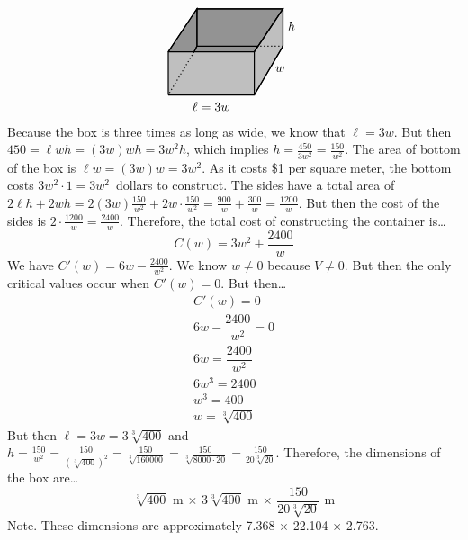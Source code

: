 \documentclass[12pt,letterpaper]{exam}
\begin{document}
\begin{questions}
{	\[
	\begin{tikzpicture}[scale=0.8]
	\draw[line width=0.03cm,fill=gray!85] (0.9,1.5) -- (3,1.5) -- (4,3) -- (1,3) -- (0.9,1.5);
	\draw[line width=0.03cm,fill=gray!85] (0,1.5) -- (0.9,1.50) -- (1,1.7) -- (1,3) -- (0,1.5);
	\draw[line width=0.03cm,fill=gray!50] (0,0) -- (3,0) -- (3,1.5) -- (0,1.5) -- (0,0);
	\draw[line width=0.03cm,fill=gray!50] (3,0) -- (4,1.7) -- (4,3) -- (3,1.5) -- (3,0);
	\draw[line width=0.03cm] (0,1.5) -- (1,3) -- (4,3) -- (3,1.5);
	\draw[line width=0.03cm] (4,3) -- (4,1.7) -- (3,0);
	\draw[line width=0.03cm,dotted] (4,1.7) -- (3.12,1.7);
	\draw[line width=0.03cm] (3.12,1.7) -- (1,1.7) -- (1,3);
	\draw[line width=0.03cm] (1,1.7) -- (0.9,1.5);
	\draw[line width=0.03cm,dotted] (0.9,1.5) -- (0,0);
	\node at (1.5,-0.4) {$\ell= 3w$};
	\node at (3.9,0.9) {$w$};
	\node at (4.3,2.4) {$h$};
	\end{tikzpicture}
	\]
Because the box is three times as long as wide, we know that $\ell= 3w$. But then $450= \ell wh= (3w)wh= 3w^2h$, which implies $h= \frac{450}{3w^2}= \frac{150}{w^2}$. The area of bottom of the box is $\ell w= (3w)w= 3w^2$. As it costs \$1 per square meter, the bottom costs $3w^2 \cdot 1= 3w^2$~dollars to construct. The sides have a total area of $2 \ell h + 2wh= 2(3w) \frac{150}{w^2} + 2w \cdot \frac{150}{w^2}= \frac{900}{w} + \frac{300}{w}= \frac{1200}{w}$. But then the cost of the sides is $2 \cdot \frac{1200}{w}= \frac{2400}{w}$. Therefore, the total cost of constructing the container is\dots
	\[
	C(w)= 3w^2 + \frac{2400}{w}
	\]
We have $C'(w)= 6w - \frac{2400}{w^2}$. We know $w \neq 0$ because $V \neq 0$. But then the only critical values occur when $C'(w)= 0$. But then\dots
	\[
	\begin{gathered}
	C'(w)= 0 \\
	6w - \dfrac{2400}{w^2}= 0 \\
	6w= \dfrac{2400}{w^2} \\
	6w^3= 2400 \\
	w^3= 400 \\
	w= \sqrt[3]{400}
	\end{gathered}
	\]
But then $\ell= 3w= 3\sqrt[3]{400}$ and $h= \frac{150}{w^2}= \frac{150}{(\sqrt[3]{400})^2}= \frac{150}{\sqrt[3]{160000}}= \frac{150}{\sqrt[3]{8000 \cdot 20}}= \frac{150}{20 \sqrt[3]{20}}$. Therefore, the dimensions of the box are\dots
	\[
	\sqrt[3]{400} \text{ m} \,\times\, 3 \sqrt[3]{400} \text{ m} \,\times\, \frac{150}{20 \sqrt[3]{20}} \text{ m}
	\]
\vfill
{\tiny Note. These dimensions are approximately 7.368 $\times$ 22.104 $\times$ 2.763.}
}




\end{questions}
\end{document}
